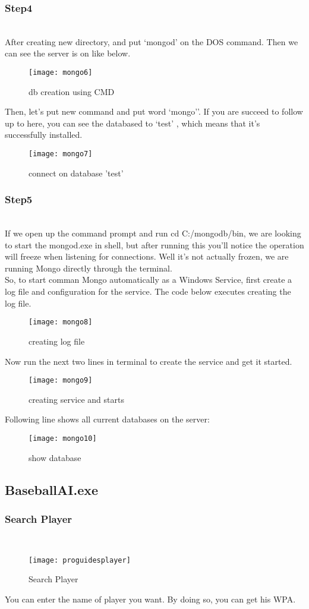 \documentclass[conference,compsoc, twocolumn]{IEEEtran}
\begin{document}
\subsubsection{Step4}\\
After creating new directory, and put ‘mongod’ on the DOS command. Then we can see the server is on like below. 
\begin{figure}[H]
\centering\texttt{[image: mongo6]}
\caption{db creation using CMD}
\end{figure}
Then, let’s put new command and put word ‘mongo’’. If you are succeed to follow up to here, you can see the databased to ‘test’ , which means that it’s successfully installed.
\begin{figure}[H]
\centering\texttt{[image: mongo7]}
\caption{connect on database 'test'}
\end{figure}

\subsubsection{Step5}\\
If we open up the command prompt and run cd C:/mongodb/bin, we are looking to start the mongod.exe in shell, but after running this you’ll notice the operation will freeze when listening for connections. Well it’s not actually frozen, we are running Mongo directly through the terminal.\\
So, to start comman Mongo automatically as a Windows Service, first create a log file and configuration for the service. The code below executes creating the log file.
\begin{figure}[H]
\centering\texttt{[image: mongo8]}
\caption{creating log file}
\end{figure}
Now run the next two lines in terminal to create the service and get it started.
\begin{figure}[H]
\centering\texttt{[image: mongo9]}
\caption{creating service and starts}
\end{figure}
Following line shows all current databases on the server:
\begin{figure}[H]
\centering\texttt{[image: mongo10]}
\caption{show database}
\end{figure}


\subsection{BaseballAI.exe}
\subsubsection{Search Player}\\
\begin{figure}[H]
\centering\texttt{[image: proguidesplayer]}
\caption{Search Player}
\end{figure}
You can enter the name of player you want. By doing so, you can get his WPA.
\end{document}
